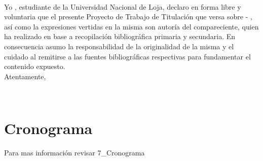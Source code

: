 \newpage
{}\\

Yo \miNombre, estudiante de la Universidad Nacional de Loja, declaro en forma libre y voluntaria que el presente Proyecto de Trabajo de Titulación que versa sobre \textbf{\titulo}- \textbf{\tituloEng}, así como la expresiones vertidas en la misma son autoría del compareciente, quien ha realizado en base a recopilación bibliográfica primaria y secundaria. En consecuencia asumo la responsabilidad de la originalidad de la misma y el cuidado al remitirse a las fuentes bibliográficas respectivas para fundamentar el contenido expuesto.\\
\linebreak 
\linebreak 
\linebreak 
\linebreak 
\linebreak 
\linebreak 
Atentamente,\\
\miNombre

\newpage
\tableofcontents
\newpage
\listoffigures
\newpage
\listoftables

\newpage
\vspace*{6cm}
\begin{center}
\addtolength{\baselineskip}{\baselineskip}
\begin{Huge}
\textbf {\titulo}\\ \subtitulo
\end{Huge}
\end{center}

\mainmatter







\chapter{Cronograma}
\label{Cronograma}
Para mas información revisar \cite{gantt}
{7_Cronograma}




\printglossary[style=modsuper,type=\acronymtype,title={Lista de Acrónimos y Abreviaturas}]
\glsaddallunused 

\appendix %



